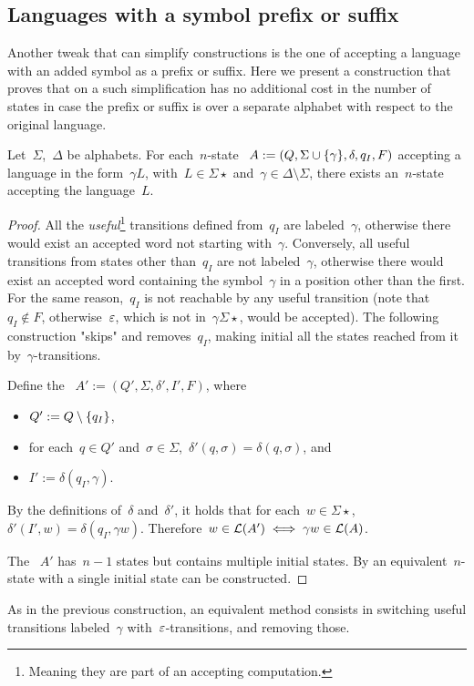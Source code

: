 \subsection{Languages with a symbol prefix or suffix}
Another tweak that can simplify constructions is the one of accepting a language with an added symbol as a prefix or suffix.
Here we present a construction that proves that on a \ONFA such simplification has no additional cost in the number of states in case the prefix or suffix is over a separate alphabet with respect to the original language.
\begin{thrm}
	Let~$\Sigma$,~$\Delta$ be alphabets.
	For each~$n$-state \ONFA~$A:=(Q,\Sigma\cup\{\gamma\},\delta,q_I,F)$ accepting a language in the form~$\gamma L$, with~$L\in\Sigma\star$ and~$\gamma\in\Delta\setminus\Sigma$, there exists an~$n$-state \ONFA accepting the language~$L$.
\end{thrm}
\begin{proof}
	All the \emph{useful}\footnote{Meaning they are part of an accepting computation.} transitions defined from~$q_I$ are labeled~$\gamma$, otherwise there would exist an accepted word not starting with~$\gamma$.
	Conversely, all useful transitions from states other than~$q_I$ are not labeled~$\gamma$, otherwise there would exist an accepted word containing the symbol~$\gamma$ in a position other than the first.
	For the same reason,~$q_I$ is not reachable by any useful transition (note that~$q_I\notin F$, otherwise~$\varepsilon$, which is not in~$\gamma\Sigma\star$, would be accepted).
	The following construction "skips" and removes~$q_I$, making initial all the states reached from it by~$\gamma$-transitions.

	Define the \ONFA~$A':=(Q',\Sigma,\delta',I',F)$, where
	\begin{itemize}
		\item $Q':=Q\setminus\{q_I\}$,
		\item for each~$q\in Q'$ and~$\sigma\in\Sigma$,~$\delta'(q,\sigma)=\delta(q,\sigma)$, and
		\item $I':=\delta(q_I,\gamma)$.
	\end{itemize}

	By the definitions of~$\delta$ and~$\delta'$, it holds that for each~$w\in\Sigma\star$,~$\delta'(I',w)=\delta(q_I,\gamma w)$.
	Therefore~$w\in\mathcal L(A')\iff \gamma w\in\mathcal L(A)$.

	The \ONFA~$A'$ has~$n-1$ states but contains multiple initial states. By  an equivalent~$n$-state \ONFA with a single initial state can be constructed.
\end{proof}
As in the previous construction, an equivalent method consists in switching useful transitions labeled~$\gamma$ with~$\varepsilon$-transitions, and removing those.

